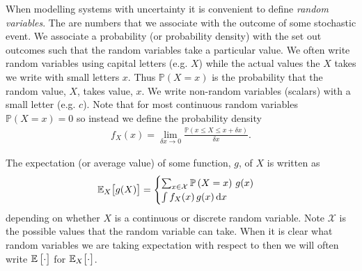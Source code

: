 \documentclass{sotonExamBoxes}    %
\newcommand{\Prob}[1]{\mathbb{P}\left(#1\right)}
\newcommand{\dd}{\mathrm{d}}
\newcommand{\av}[2][\,]{\mathbb{E}_{#1}\!\left[ {\strut #2} \right]}
\begin{document}


\maketitle

When modelling systems with uncertainty it is convenient to define
\textit{random variables}.  The are numbers that we associate with the
outcome of some stochastic event.  We associate a probability (or
probability density) with the set out outcomes such that the random
variables take a particular value.  We often write random
variables using capital letters (e.g. $X$) while the actual values the
$X$ takes we write with small letters $x$.  Thus $\Prob{X=x}$ is the
probability that the random value, $X$, takes value, $x$.  We write
non-random variables (scalars) with a small letter (e.g. $c$).  Note
that for most continuous random variables $\Prob{X=x}=0$ so instead we
define the probability density
\begin{align*}
  f_X(x) = \lim_{\delta x \rightarrow 0} \frac{\Prob{x\leq X \leq
  x+\delta x}}{\delta x}.
\end{align*}

The expectation (or average value) of some function, $g$, of $X$ is
written as
\begin{align*}
  \av[X]{g(X)} =
  \begin{cases}
    \sum_{x\in \mathcal{X}} \Prob{X=x}\, g(x) \\
    \int f_X(x) \, g(x)\, \dd x
  \end{cases}
\end{align*}
depending on whether $X$ is a continuous or discrete random variable.
Note $\mathcal{X}$ is the possible values that the random variable can take.
When it is clear what random variables we are taking expectation with
respect to then we will often write $\av{\cdot}$ for $\av[X]{\cdot}$.




\end{document}
